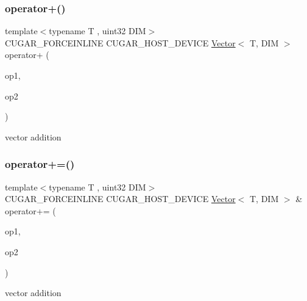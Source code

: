\subsubsection{\texorpdfstring{operator+()}{operator+()}}
{\footnotesize\ttfamily template$<$typename T , uint32 D\+IM$>$ \\
C\+U\+G\+A\+R\+\_\+\+F\+O\+R\+C\+E\+I\+N\+L\+I\+NE C\+U\+G\+A\+R\+\_\+\+H\+O\+S\+T\+\_\+\+D\+E\+V\+I\+CE \hyperlink{structcugar_1_1_vector}{Vector}$<$ T, D\+IM $>$ operator+ (\begin{DoxyParamCaption}\item[{const \hyperlink{structcugar_1_1_vector}{Vector}$<$ T, D\+IM $>$ \&}]{op1,  }\item[{const \hyperlink{structcugar_1_1_vector}{Vector}$<$ T, D\+IM $>$ \&}]{op2 }\end{DoxyParamCaption})\hspace{0.3cm}{\ttfamily [related]}}

vector addition \mbox{\label{group___vectors_module_gab459e58fcb21396fafa8f4a2d562a8e1}} 
\subsubsection{\texorpdfstring{operator+=()}{operator+=()}}
{\footnotesize\ttfamily template$<$typename T , uint32 D\+IM$>$ \\
C\+U\+G\+A\+R\+\_\+\+F\+O\+R\+C\+E\+I\+N\+L\+I\+NE C\+U\+G\+A\+R\+\_\+\+H\+O\+S\+T\+\_\+\+D\+E\+V\+I\+CE \hyperlink{structcugar_1_1_vector}{Vector}$<$ T, D\+IM $>$ \& operator+= (\begin{DoxyParamCaption}\item[{\hyperlink{structcugar_1_1_vector}{Vector}$<$ T, D\+IM $>$ \&}]{op1,  }\item[{const \hyperlink{structcugar_1_1_vector}{Vector}$<$ T, D\+IM $>$ \&}]{op2 }\end{DoxyParamCaption})\hspace{0.3cm}{\ttfamily [related]}}

vector addition \mbox{\label{group___vectors_module_ga79019254703773ad3d352a503d3d820a}} 
